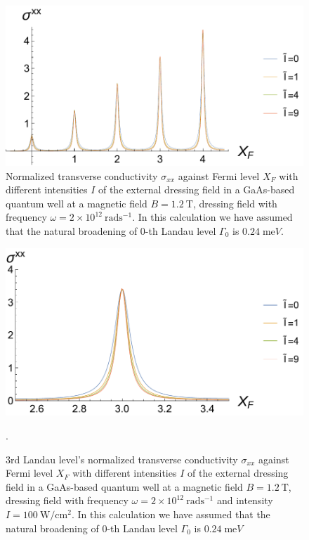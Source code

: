 \begin{figure}[t]
\includegraphics[scale=0.55]{figures/fig_5}
\caption{\label{fig_5} Normalized transverse conductivity $\sigma_{xx}$ against Fermi level $X_F$ with different intensities $I$ of the external dressing field in a GaAs-based quantum well at a magnetic field $B = 1.2~\text{T}$, dressing field with frequency $\omega =2\times10^{12}~\text{rad}\text{s}^{-1}$. In this calculation we have assumed that the natural  broadening of $0$-th Landau level $\Gamma_0$ is $0.24\;\text{me}V$.}
\end{figure}
\begin{figure}[t]
\includegraphics[scale=0.55]{figures/fig_6}
\caption{\label{fig_6} $3$rd Landau level’s normalized transverse conductivity $\sigma_{xx}$ against Fermi level $X_F$ with different intensities $I$ of the external dressing field in a GaAs-based quantum well at a magnetic field $B = 1.2~\text{T}$, dressing field with frequency $\omega =2\times10^{12}~\text{rad}\text{s}^{-1}$ and intensity $I =100~\text{W}/\text{cm}^{2}$. In this calculation we have assumed that the natural  broadening of $0$-th Landau level $\Gamma_0$ is $0.24\;\text{me}V$}.
\end{figure}

